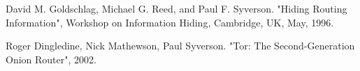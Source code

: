 \documentclass[journal]{IEEEtran}
\begin{document}
			
			
			
			
		
		
	\begin{thebibliography}{1}

			David M. Goldschlag, Michael G. Reed, and Paul F. Syverson. "Hiding Routing Information", Workshop on Information Hiding, Cambridge, UK, May, 1996.
		
			Roger Dingledine, Nick Mathewson, Paul Syverson. "Tor: The Second-Generation Onion Router", 2002.
		
	\end{thebibliography}
\end{document}
